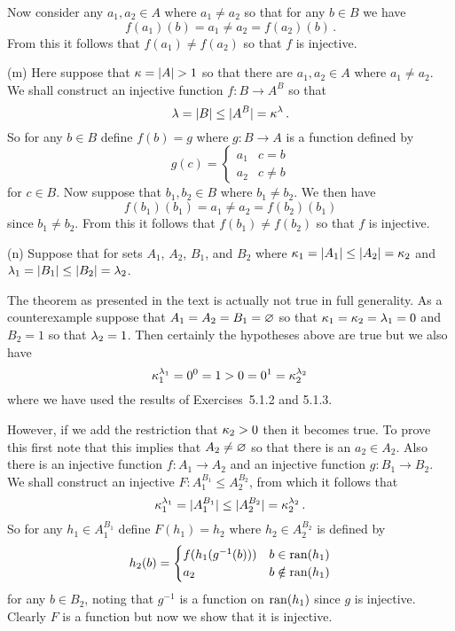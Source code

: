\begin{solution}
    Now consider any $a_1, a_2 \in A$ where $a_1 \neq a_2$ so that for any $b \in B$ we have
    $$
    f(a_1)(b) = a_1 \neq a_2 = f(a_2)(b) \,.
    $$
    From this it follows that $f(a_1) \neq f(a_2)$ so that $f$ is injective. \qedsymbol

    (m) Here suppose that $\kappa = |A| > 1$ so that there are $a_1, a_2 \in A$ where $a_1 \neq a_2$.
    We shall construct an injective function $f: B  \to A^B$ so that
    $$
    \lambda = |B| \leq |A^B| = \kappa^\lambda \,.
    $$
    So for any $b \in B$ define $f(b) = g$ where $g: B \to A$ is a function defined by
    $$
    g(c) =
    \begin{cases}
        a_1 & c = b \\
        a_2 & c \neq b
    \end{cases}
    $$
    for $c \in B$.
    Now suppose that $b_1, b_2 \in B$ where $b_1 \neq b_2$.
    We then have
    $$
    f(b_1)(b_1) = a_1 \neq a_2 = f(b_2)(b_1)
    $$
    since $b_1 \neq b_2$.
    From this it follows that $f(b_1) \neq f(b_2)$ so that $f$ is injective. \qedsymbol

    (n) Suppose that
    for sets $A_1$, $A_2$, $B_1$, and $B_2$ where $\kappa_1 = |A_1| \leq |A_2| = \kappa_2$ and $\lambda_1 = |B_1| \leq |B_2| = \lambda_2$.

    The theorem as presented in the text is actually not true in full generality.
    As a counterexample suppose that $A_1 = A_2 = B_1 = \varnothing$ so that $\kappa_1 = \kappa_2 = \lambda_1 = 0$ and $B_2 = 1$ so that $\lambda_2 = 1$.
    Then certainly the hypotheses above are true but we also have
    $$
    \kappa_1^{\lambda_1} = 0^0 = 1 > 0 = 0^1 = \kappa_2^{\lambda_2} \,
    $$
    where we have used the results of Exercises~5.1.2 and 5.1.3.

    However, if we add the restriction that $\kappa_2 > 0$ then it becomes true.
    To prove this first note that this implies that $A_2 \neq \varnothing$ so that there is an $a_2 \in A_2$.
    Also there is an injective function $f: A_1 \to A_2$ and an injective function $g: B_1 \to B_2$.
    We shall construct an injective $F: A_1^{B_1} \leq A_2^{B_2}$, from which it follows that
    $$
    \kappa_1^{\lambda_1} = |A_1^{B_1}| \leq |A_2^{B_2}| = \kappa_2^{\lambda_2} \,.
    $$
    So for any $h_1 \in A_1^{B_1}$ define $F(h_1) = h_2$ where $h_2 \in A_2^{B_2}$ is defined by
    $$
    h_2(b) = \begin{cases}
    	f(h_1(g^{-1}(b))) & b \in \mathrm{ran}(h_1) \\
        a_2 & b \notin \mathrm{ran}(h_1)
    \end{cases}
    $$
    for any $b \in B_2$, noting that $g^{-1}$ is a function on $\mathrm{ran}(h_1)$ since $g$ is injective.
    Clearly $F$ is a function but now we show that it is injective.


\end{solution}
